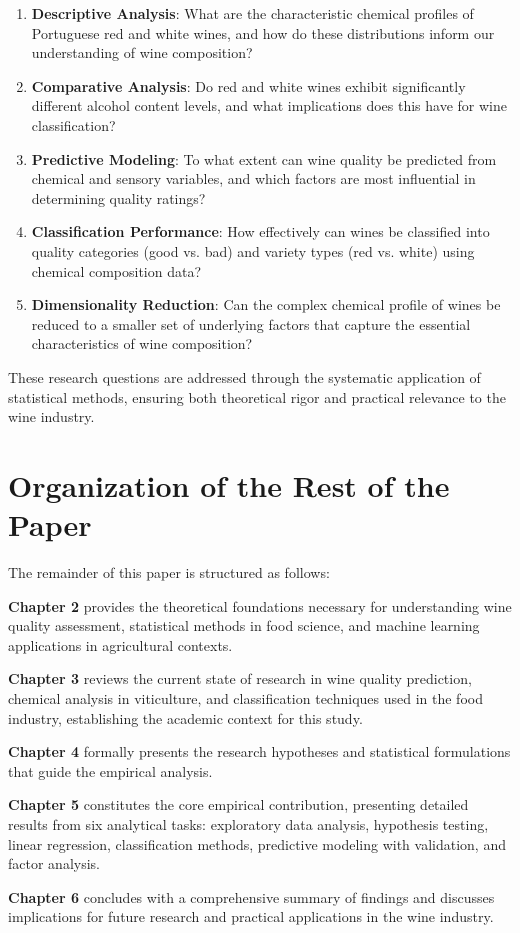 \begin{enumerate}
	\item \textbf{Descriptive Analysis}: What are the characteristic chemical profiles of Portuguese red and white wines, and how do these distributions inform our understanding of wine composition?
	
	\item \textbf{Comparative Analysis}: Do red and white wines exhibit significantly different alcohol content levels, and what implications does this have for wine classification?
	
	\item \textbf{Predictive Modeling}: To what extent can wine quality be predicted from chemical and sensory variables, and which factors are most influential in determining quality ratings?
	
	\item \textbf{Classification Performance}: How effectively can wines be classified into quality categories (good vs. bad) and variety types (red vs. white) using chemical composition data?
	
	\item \textbf{Dimensionality Reduction}: Can the complex chemical profile of wines be reduced to a smaller set of underlying factors that capture the essential characteristics of wine composition?
\end{enumerate}

These research questions are addressed through the systematic application of statistical methods, ensuring both theoretical rigor and practical relevance to the wine industry.

\section{Organization of the Rest of the Paper}

The remainder of this paper is structured as follows:

\textbf{Chapter 2} provides the theoretical foundations necessary for understanding wine quality assessment, statistical methods in food science, and machine learning applications in agricultural contexts.

\textbf{Chapter 3} reviews the current state of research in wine quality prediction, chemical analysis in viticulture, and classification techniques used in the food industry, establishing the academic context for this study.

\textbf{Chapter 4} formally presents the research hypotheses and statistical formulations that guide the empirical analysis.

\textbf{Chapter 5} constitutes the core empirical contribution, presenting detailed results from six analytical tasks: exploratory data analysis, hypothesis testing, linear regression, classification methods, predictive modeling with validation, and factor analysis.

\textbf{Chapter 6} concludes with a comprehensive summary of findings and discusses implications for future research and practical applications in the wine industry.